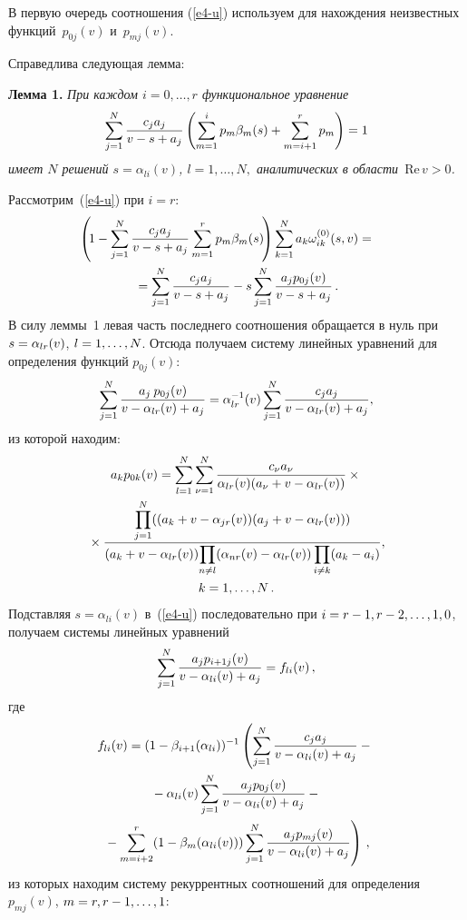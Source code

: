 \begin{multicols}{2}
В первую очередь соотношения (\ref{e4-u}) используем для нахождения 
неизвестных функций~$p_{0j}(v)$ и~$p_{mj}(v)$.

Справедлива следующая лемма:

\medskip

\noindent
\textbf{Лемма 1.} \textit{При каждом $i=0,\ldots,r$ функциональное уравнение}
\begin{equation*}
\sum\limits_{j=1}^N\displaystyle\frac{\displaystyle c_ja_j\mathstrut}{\displaystyle v-s+a_j\mathstrut}\left(\sum\limits_{m=1}^ip_m\beta_m(s)+\sum\limits_{m=i+1}^rp_m\right)=1
\end{equation*}
\textit{имеет $N$ решений $s=\alpha_{li}(v)$, $l=1,\ldots,N,$ аналитических в 
области~$\mathrm{Re}\,v>0$.}

\smallskip

Рассмотрим~(\ref{e4-u}) при $i=r$:
\begin{multline*}
\hspace*{-5mm}\left(\!1-\sum\limits_{j=1}^N\fr{c_ja_j}{v-s+a_j}
\sum\limits_{m=1}^rp_m\beta_m(s)\!\right)
\sum\limits_{k=1}^N a_k \omega_{ik}^{(0)}(s,v)={}\\
{}=
\sum\limits_{j=1}^N\fr{c_ja_j}{v-s+a_j}-s\sum\limits_{j=1}^N\fr{a_jp_{0j}(v)}{v-s+a_j}\,.
\end{multline*}
В силу леммы~1 левая часть последнего соотношения обращается 
в нуль при $s\hm=\alpha_{lr}(v)$, $l\hm=1,\ldots,N$. Отсюда
получаем систему линейных уравнений для определения функций $p_{0j}(v)$:
\begin{equation*}
\sum\limits_{j=1}^N\displaystyle\frac{\displaystyle a_j\:p_{0j}(v)\mathstrut}{\displaystyle v-\alpha_{lr}(v)+a_j\mathstrut}=
\alpha_{lr}^{-1}(v)\sum\limits_{j=1}^N\displaystyle\frac{\displaystyle c_ja_j\mathstrut}{\displaystyle v-\alpha_{lr}(v)+a_j\mathstrut},
\end{equation*}
из которой находим:
\begin{multline*}
a_k p_{0k}(v)=\sum\limits_{l=1}^N\sum\limits_{\nu=1}^N\displaystyle\frac{\displaystyle c_{\nu}a_{\nu}\mathstrut}{\displaystyle \alpha_{lr}(v)(a_\nu+v-\alpha_{lr}(v))\mathstrut}\times{}\\
{}\times
\displaystyle\frac{\displaystyle \prod\limits_{j=1}^N((a_k+v-\alpha_{jr}(v))(a_j+v-\alpha_{lr}(v)))\mathstrut}{\displaystyle (a_k+v-\alpha_{lr}(v)) \!\prod\limits_{n\ne l}(\alpha_{nr}(v)-\alpha_{lr}(v))
\prod\limits_{i\ne k}(a_k-a_i)\mathstrut},\\
k=1,\ldots,N\,.
\end{multline*}
Подставляя $s=\alpha_{li}(v)$ в~(\ref{e4-u}) последовательно при $i\hm=r-1,r-2,\ldots,1,0$,  
получаем системы линейных уравнений
\begin{equation*}
\sum\limits_{j=1}^N\displaystyle\frac{\displaystyle a_j p_{i+1j}(v)\mathstrut}{\displaystyle v-\alpha_{li}(v)+a_j\mathstrut}=f_{li}(v)\,,
\end{equation*}
где
\begin{multline*}
f_{li}(v)=(1-\beta_{i+1}(\alpha_{li}))^{-1}\left(\sum\limits_{j=1}^N\displaystyle\frac{\displaystyle c_ja_j\mathstrut}{\displaystyle v-\alpha_{li}(v)+a_j\mathstrut}-{}\right.\\
{}-\alpha_{li}(v)\sum\limits_{j=1}^N\displaystyle\frac{\displaystyle a_jp_{0j}(v)\mathstrut}{\displaystyle v-\alpha_{li}(v)+a_j\mathstrut}-{}\\
\left.{}-\sum\limits_{m=i+2}^r
(1-\beta_m(\alpha_{li}(v)))\sum\limits_{j=1}^N\displaystyle\frac{\displaystyle a_jp_{mj}(v)\mathstrut}{\displaystyle v-\alpha_{li}(v)+a_j\mathstrut}\right)\,,
\end{multline*}
из которых находим систему рекуррентных соотношений для определения 
$p_{mj}(v)$, $m\hm=r,r-1,\ldots,1$:


\end{multicols}
